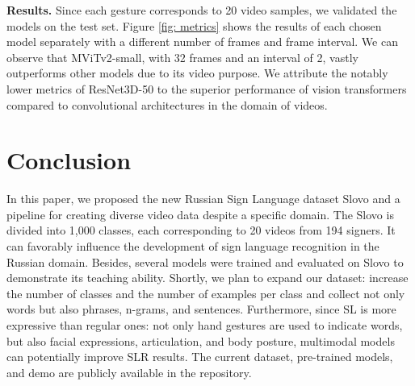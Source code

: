 \documentclass[runningheads]{llncs}
\begin{document}
\textbf{Results.} Since each gesture corresponds to 20 video samples, we validated the models on the test set. Figure \ref{fig: metrics} shows the results of each chosen model separately with a different number of frames and frame interval. We can observe that MViTv2-small, with 32 frames and an interval of 2, vastly outperforms other models due to its video purpose. We attribute the notably lower metrics of ResNet3D-50 to the superior performance of vision transformers compared to convolutional architectures in the domain of videos.









\section{Conclusion}
In this paper, we proposed the new Russian Sign Language dataset Slovo and a pipeline for creating diverse video data despite a specific domain. The Slovo is divided into 1,000 classes, each corresponding to 20 videos from 194 signers. It can favorably influence the development of sign language recognition in the Russian domain. Besides, several models were trained and evaluated on Slovo to demonstrate its teaching ability. Shortly, we plan to expand our dataset: increase the number of classes and the number of examples per class and collect not only words but also phrases, n-grams, and sentences. Furthermore, since SL is more expressive than regular ones: not only hand gestures are used to indicate words, but also facial expressions, articulation, and body posture, multimodal models can potentially improve SLR results. The current dataset, pre-trained models, and demo are publicly available in the repository.



\end{document}
